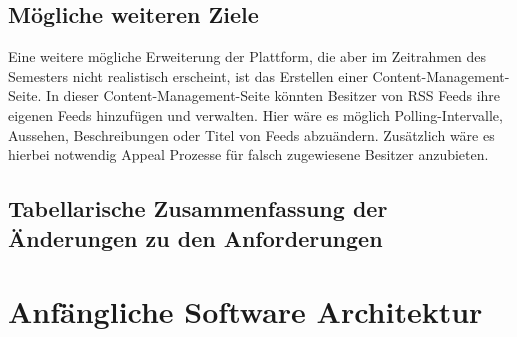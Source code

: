 \subsection{Mögliche weiteren Ziele}
Eine weitere mögliche Erweiterung der Plattform, die aber im Zeitrahmen des Semesters nicht realistisch erscheint, ist das Erstellen einer Content-Management-Seite.
In dieser Content-Management-Seite könnten Besitzer von RSS Feeds ihre eigenen Feeds hinzufügen und verwalten.
Hier wäre es möglich Polling-Intervalle, Aussehen, Beschreibungen oder Titel von Feeds abzuändern.
Zusätzlich wäre es hierbei notwendig Appeal Prozesse für falsch zugewiesene Besitzer anzubieten.
\subsection{Tabellarische Zusammenfassung der Änderungen zu den Anforderungen}

\begin{table}[h]
\end{table}

\section{Anfängliche Software Architektur}

